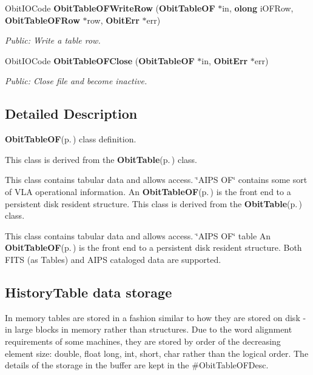 \begin{CompactItemize}
Obit\-IOCode {\bf Obit\-Table\-OFWrite\-Row} ({\bf Obit\-Table\-OF} $\ast$in, {\bf olong} i\-OFRow, {\bf Obit\-Table\-OFRow} $\ast$row, {\bf Obit\-Err} $\ast$err)
\begin{CompactList}\small\item\em Public: Write a table row. \item\end{CompactList}\item 
Obit\-IOCode {\bf Obit\-Table\-OFClose} ({\bf Obit\-Table\-OF} $\ast$in, {\bf Obit\-Err} $\ast$err)
\begin{CompactList}\small\item\em Public: Close file and become inactive. \item\end{CompactList}\end{CompactItemize}


\subsection{Detailed Description}
{\bf Obit\-Table\-OF}{\rm (p.\,\pageref{structObitTableOF})} class definition. 

This class is derived from the {\bf Obit\-Table}{\rm (p.\,\pageref{structObitTable})} class.

This class contains tabular data and allows access. \char`\"{}AIPS OF\char`\"{} contains some sort of VLA operational information. An {\bf Obit\-Table\-OF}{\rm (p.\,\pageref{structObitTableOF})} is the front end to a persistent disk resident structure. This class is derived from the {\bf Obit\-Table}{\rm (p.\,\pageref{structObitTable})} class.

This class contains tabular data and allows access. \char`\"{}AIPS OF\char`\"{} table An {\bf Obit\-Table\-OF}{\rm (p.\,\pageref{structObitTableOF})} is the front end to a persistent disk resident structure. Both FITS (as Tables) and AIPS cataloged data are supported.\subsection{History\-Table data storage}\label{ObitTableWX_8h_TableDataStorage}
In memory tables are stored in a fashion similar to how they are stored on disk - in large blocks in memory rather than structures. Due to the word alignment requirements of some machines, they are stored by order of the decreasing element size: double, float long, int, short, char rather than the logical order. The details of the storage in the buffer are kept in the \#Obit\-Table\-OFDesc.

